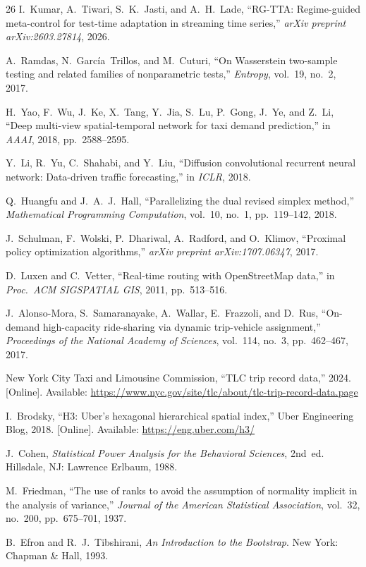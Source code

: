 \documentclass[conference,10pt]{IEEEtran}
\begin{document}
\begin{thebibliography}{26}
I.~Kumar, A.~Tiwari, S.~K.~Jasti, and A.~H.~Lade,
``RG-TTA: Regime-guided meta-control for test-time adaptation in
streaming time series,''
\emph{arXiv preprint arXiv:2603.27814}, 2026.

A.~Ramdas, N.~Garc{\'i}a~Trillos, and M.~Cuturi,
``On Wasserstein two-sample testing and related families of nonparametric tests,''
\emph{Entropy}, vol.~19, no.~2, 2017.

H.~Yao, F.~Wu, J.~Ke, X.~Tang, Y.~Jia, S.~Lu, P.~Gong, J.~Ye, and Z.~Li,
``Deep multi-view spatial-temporal network for taxi demand prediction,''
in \emph{AAAI}, 2018, pp.~2588--2595.

Y.~Li, R.~Yu, C.~Shahabi, and Y.~Liu,
``Diffusion convolutional recurrent neural network: Data-driven traffic forecasting,''
in \emph{ICLR}, 2018.

Q.~Huangfu and J.~A.~J.~Hall,
``Parallelizing the dual revised simplex method,''
\emph{Mathematical Programming Computation}, vol.~10, no.~1, pp.~119--142, 2018.

J.~Schulman, F.~Wolski, P.~Dhariwal, A.~Radford, and O.~Klimov,
``Proximal policy optimization algorithms,''
\emph{arXiv preprint arXiv:1707.06347}, 2017.

D.~Luxen and C.~Vetter,
``Real-time routing with OpenStreetMap data,''
in \emph{Proc.\ ACM SIGSPATIAL GIS}, 2011, pp.~513--516.

J.~Alonso-Mora, S.~Samaranayake, A.~Wallar, E.~Frazzoli, and D.~Rus,
``On-demand high-capacity ride-sharing via dynamic trip-vehicle assignment,''
\emph{Proceedings of the National Academy of Sciences}, vol.~114, no.~3,
pp.~462--467, 2017.

{New York City Taxi and Limousine Commission},
``TLC trip record data,'' 2024.
[Online]. Available: \url{https://www.nyc.gov/site/tlc/about/tlc-trip-record-data.page}

I.~Brodsky,
``H3: Uber's hexagonal hierarchical spatial index,''
Uber Engineering Blog, 2018.
[Online]. Available: \url{https://eng.uber.com/h3/}

J.~Cohen,
\emph{Statistical Power Analysis for the Behavioral Sciences}, 2nd~ed.
Hillsdale, NJ: Lawrence Erlbaum, 1988.

M.~Friedman,
``The use of ranks to avoid the assumption of normality implicit in the
analysis of variance,''
\emph{Journal of the American Statistical Association}, vol.~32, no.~200,
pp.~675--701, 1937.

B.~Efron and R.~J.~Tibshirani,
\emph{An Introduction to the Bootstrap}.
New York: Chapman \& Hall, 1993.

\end{thebibliography}
\end{document}
